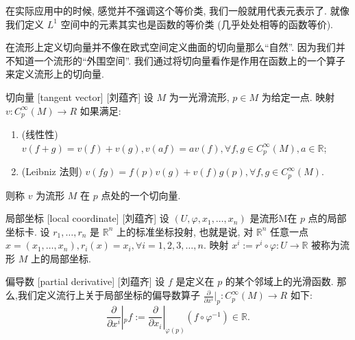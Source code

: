 \documentclass[UTF8]{ctexart}
\begin{document}
        \begin{rmk}
            []
            在实际应用中的时候, 感觉并不强调这个等价类, 我们一般就用代表元表示了. 就像我们定义 \(L^1\) 空间中的元素其实也是函数的等价类 (几乎处处相等的函数等价). 
        \end{rmk}
        
        在流形上定义切向量并不像在欧式空间定义曲面的切向量那么“自然”. 因为我们并不知道一个流形的“外围空间”. 我们通过将切向量看作是作用在函数上的一个算子来定义流形上的切向量. 
        \begin{dfn}
            []
            {切向量}
            [tangent vector]
            [刘蕴齐]
            设 \(M\) 为一光滑流形,  \(p \in M\) 为给定一点. 映射 \( v: C_p^{\infty} (M) \to R \) 如果满足:
            \begin{enumerate}
                \item (线性性)  \(v (f + g) =v( f ) + v( g ), v(a f) = av( f ), \forall f,g \in C_p^{\infty} (M), a \in \mathbb{R}\); 
                \item (Leibniz 法则)  \( v(f g) = f(p)v(g)+v(f)g(p), \forall f,g \in C_p^{\infty} (M)\).
            \end{enumerate}
            则称 \(v\) 为流形 \(M\) 在 \(p\) 点处的一个切向量. 
        \end{dfn}

        \begin{dfn}
            []
            {局部坐标}
            [local coordinate]
            [刘蕴齐]
            设 \((U, \varphi, x_1, \dots, x_n)\) 是流形M在 \(p\) 点的局部坐标卡. 设 \(r_1, \dots, r_n \) 是 \(\mathbb{R}^n\) 上的标准坐标投射, 也就是说, 对 \(\mathbb{R}^n\) 任意一点  \(x = (x_1, \dots, x_n), r_i(x) = x_i, \forall i= 1,2,3, \dots, n\).
            映射 \(x^i:= r^i \circ \varphi: U \to \mathbb{R}\) 被称为流形 \(M\) 上的局部坐标. 
        \end{dfn}

        \begin{dfn}
            []
            {偏导数}
            [partial derivative]
            [刘蕴齐]
            设 \(f\) 是定义在 \(p\) 的某个邻域上的光滑函数.  
            那么,我们定义流行上关于局部坐标的偏导数算子 \(\frac{\partial}{\partial x^i} |_p: C_p^{\infty} (M) \to R\) 如下:
                \[
                \frac{\partial}{\partial x^i} |_p f:= \frac{\partial}{\partial x_i}|_{\varphi(p)} (f \circ \varphi^{-1} ) \in \mathbb{R}.
                \]
        \end{dfn}
\end{document}
